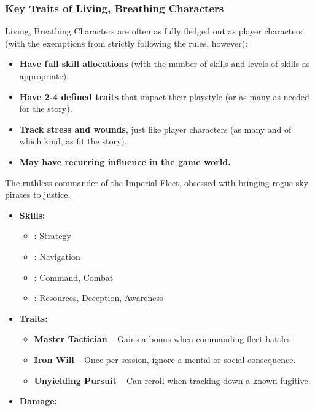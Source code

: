 \subsubsection{Key Traits of Living, Breathing Characters}
Living, Breathing Characters are often as fully fledged out as player characters (with the exemptions from strictly following the rules, however):
\begin{itemize}
    \item \textbf{Have full skill allocations} (with the number of skills and levels of skills as appropriate).
    \item \textbf{Have 2-4 defined traits} that impact their playstyle (or as many as needed for the story).
    \item \textbf{Track stress and wounds}, just like player characters (as many and of which kind, as fit the story).
    \item \textbf{May have recurring influence in the game world.}
\end{itemize}

\begin{WyrdExample}
	The ruthless commander of the Imperial Fleet, obsessed with bringing rogue sky pirates to justice.
	\begin{itemize}
    	\item \textbf{Skills:}
        	\begin{itemize}
	            \item \Superior: Strategy
	            \item \Expert: Navigation
    	        \item \Skilled: Command, Combat
        	    \item \Novice: Resources, Deception, Awareness
	        \end{itemize}
    	\item \textbf{Traits:}
        	\begin{itemize}
	            \item \textbf{Master Tactician} – Gains a bonus when commanding fleet battles.
    	        \item \textbf{Iron Will} – Once per session, ignore a mental or social consequence.
        	    \item \textbf{Unyielding Pursuit} – Can reroll when tracking down a known fugitive.
	        \end{itemize}
	    \item \textbf{Damage:}\\\quad\DamageBox
	\end{itemize}
\end{WyrdExample}

